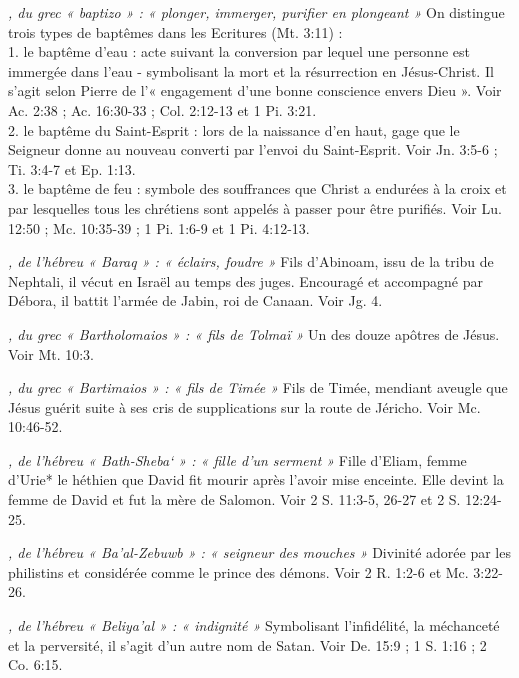 \begin{multicols}{2}
{\textit{, du grec « baptizo » : « plonger, immerger, purifier en plongeant »}\newline
On distingue trois types de baptêmes dans les Ecritures (Mt. 3:11) :
\\1. le baptême d'eau : acte suivant la conversion par lequel une personne est immergée dans l'eau - symbolisant la mort et la résurrection en Jésus-Christ. Il s'agit selon Pierre de l'« engagement d'une bonne conscience envers Dieu ». Voir Ac. 2:38 ; Ac. 16:30-33 ; Col. 2:12-13 et 1 Pi. 3:21.
\\2. le baptême du Saint-Esprit : lors de la naissance d'en haut, gage que le Seigneur donne au nouveau converti par l'envoi du Saint-Esprit. Voir Jn. 3:5-6 ; Ti. 3:4-7 et Ep. 1:13.
\\3. le baptême de feu : symbole des souffrances que Christ a endurées à la croix et par lesquelles tous les chrétiens sont appelés à passer pour être purifiés. Voir Lu. 12:50 ; Mc. 10:35-39 ; 1 Pi. 1:6-9 et 1 Pi. 4:12-13.

\textit{, de l'hébreu « Baraq » : « éclairs, foudre »}\newline
Fils d'Abinoam, issu de la tribu de Nephtali, il vécut en Israël au temps des juges. Encouragé et accompagné par Débora, il battit l'armée de Jabin, roi de Canaan. Voir Jg. 4.

\textit{, du grec « Bartholomaios » : « fils de Tolmaï »}\newline
Un des douze apôtres de Jésus. Voir Mt. 10:3.

\textit{, du grec « Bartimaios » : « fils de Timée »}\newline
Fils de Timée, mendiant aveugle que Jésus guérit suite à ses cris de supplications sur la route de Jéricho. Voir Mc. 10:46-52.

\textit{, de l'hébreu « Bath-Sheba` » : « fille d'un serment »}\newline
Fille d'Eliam, femme d'Urie* le héthien que David fit mourir après l'avoir mise enceinte. Elle devint la femme de David et fut la mère de Salomon. Voir 2 S. 11:3-5, 26-27 et 2 S. 12:24-25.

\textit{, de l'hébreu « Ba'al-Zebuwb » : « seigneur des mouches »}\newline
Divinité adorée par les philistins et considérée comme le prince des démons. Voir 2 R. 1:2-6 et Mc. 3:22-26.

\textit{, de l'hébreu « Beliya'al » : « indignité »}\newline
Symbolisant l'infidélité, la méchanceté et la perversité, il s'agit d'un autre nom de Satan. Voir De. 15:9 ; 1 S. 1:16 ; 2 Co. 6:15.

}
\end{multicols}
